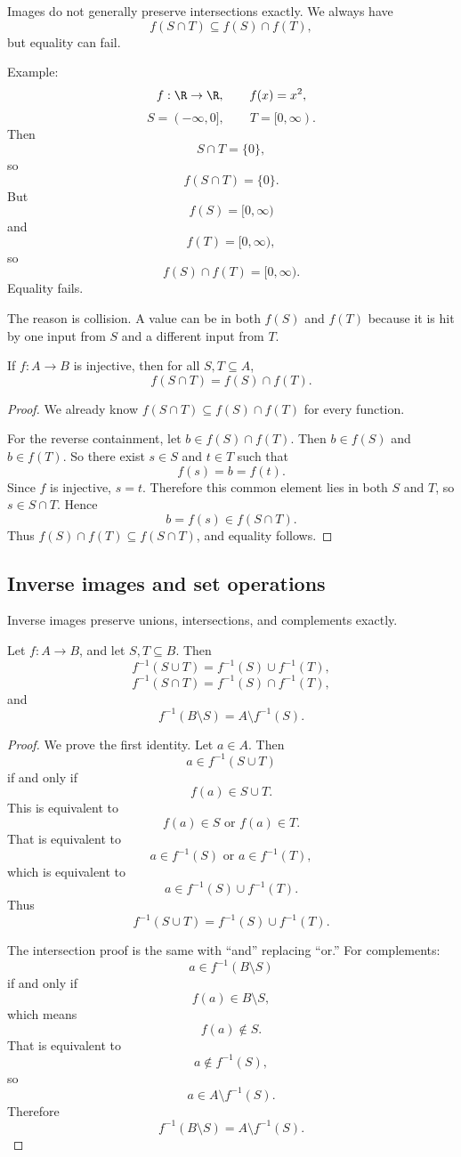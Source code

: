 Images do not generally preserve intersections exactly. We always have
\[
f(S\cap T)\subseteq f(S)\cap f(T),
\]
but equality can fail.

Example:
\[
f:\R\to\R,\qquad f(x)=x^2,
\]
\[
S=(-\infty,0],\qquad T=[0,\infty).
\]
Then
\[
S\cap T=\{0\},
\]
so
\[
f(S\cap T)=\{0\}.
\]
But
\[
f(S)=[0,\infty)
\]
and
\[
f(T)=[0,\infty),
\]
so
\[
f(S)\cap f(T)=[0,\infty).
\]
Equality fails.

The reason is collision. A value can be in both $f(S)$ and $f(T)$ because it is hit by one input from $S$ and a different input from $T$.

\begin{theorem}
If $f:A\to B$ is injective, then for all $S,T\subseteq A$,
\[
f(S\cap T)=f(S)\cap f(T).
\]
\end{theorem}

\begin{proof}
We already know $f(S\cap T)\subseteq f(S)\cap f(T)$ for every function.

For the reverse containment, let $b\in f(S)\cap f(T)$. Then $b\in f(S)$ and $b\in f(T)$. So there exist $s\in S$ and $t\in T$ such that
\[
f(s)=b=f(t).
\]
Since $f$ is injective, $s=t$. Therefore this common element lies in both $S$ and $T$, so $s\in S\cap T$. Hence
\[
b=f(s)\in f(S\cap T).
\]
Thus $f(S)\cap f(T)\subseteq f(S\cap T)$, and equality follows.
\end{proof}

\subsection{Inverse images and set operations}

Inverse images preserve unions, intersections, and complements exactly.

\begin{theorem}
Let $f:A\to B$, and let $S,T\subseteq B$. Then
\[
f^{-1}(S\cup T)=f^{-1}(S)\cup f^{-1}(T),
\]
\[
f^{-1}(S\cap T)=f^{-1}(S)\cap f^{-1}(T),
\]
and
\[
f^{-1}(B\setminus S)=A\setminus f^{-1}(S).
\]
\end{theorem}

\begin{proof}
We prove the first identity. Let $a\in A$. Then
\[
a\in f^{-1}(S\cup T)
\]
if and only if
\[
f(a)\in S\cup T.
\]
This is equivalent to
\[
f(a)\in S\text{ or }f(a)\in T.
\]
That is equivalent to
\[
a\in f^{-1}(S)\text{ or }a\in f^{-1}(T),
\]
which is equivalent to
\[
a\in f^{-1}(S)\cup f^{-1}(T).
\]
Thus
\[
f^{-1}(S\cup T)=f^{-1}(S)\cup f^{-1}(T).
\]

The intersection proof is the same with ``and'' replacing ``or.'' For complements:
\[
a\in f^{-1}(B\setminus S)
\]
if and only if
\[
f(a)\in B\setminus S,
\]
which means
\[
f(a)\notin S.
\]
That is equivalent to
\[
a\notin f^{-1}(S),
\]
so
\[
a\in A\setminus f^{-1}(S).
\]
Therefore
\[
f^{-1}(B\setminus S)=A\setminus f^{-1}(S).
\]
\end{proof}

